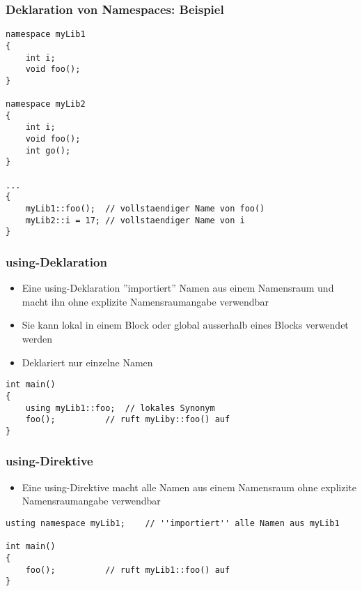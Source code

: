 \subsubsection{Deklaration von Namespaces: Beispiel\hfill}
\label{sec:Deklaration von Namespaces: Beispiel}
\noindent
\begin{minipage}{\linewidth}
\begin{lstlisting}
namespace myLib1
{
	int i;
	void foo();
}

namespace myLib2
{
	int i;
	void foo();
	int go();
}

...
{
	myLib1::foo();	// vollstaendiger Name von foo()
	myLib2::i = 17;	// vollstaendiger Name von i
}
\end{lstlisting}
\end{minipage}

\subsubsection{using-Deklaration\hfill}
\label{sec:using-Deklaration}
\begin{itemize}
	\item Eine using-Deklaration ''importiert'' Namen aus einem Namensraum und macht ihn ohne explizite Namensraumangabe verwendbar
	\item Sie kann lokal in einem Block oder global ausserhalb eines Blocks verwendet werden
	\item Deklariert nur einzelne Namen
\end{itemize}
\noindent
\begin{minipage}{\linewidth}
\begin{lstlisting}
int main()
{
	using myLib1::foo;	// lokales Synonym
	foo();			// ruft myLiby::foo() auf
}
\end{lstlisting}
\end{minipage}

\subsubsection{using-Direktive\hfill}
\label{sec:using-Direktive}
\begin{itemize}
	\item Eine using-Direktive macht alle Namen aus einem Namensraum ohne explizite Namensraumangabe verwendbar
\end{itemize}
\noindent
\begin{minipage}{\linewidth}
\begin{lstlisting}
usting namespace myLib1;	// ''importiert'' alle Namen aus myLib1

int main()
{
	foo();			// ruft myLib1::foo() auf
}
\end{lstlisting}
\end{minipage}

